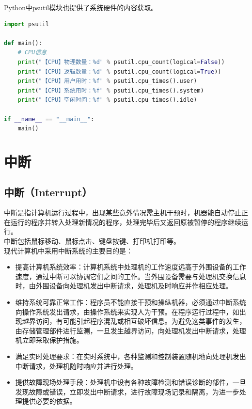 Python中psutil模块也提供了系统硬件的内容获取。 \\

\begin{lstlisting}[language=Python]
import psutil

def main():
	# CPU信息
	print("【CPU】物理数量：%d" % psutil.cpu_count(logical=False))
	print("【CPU】逻辑数量：%d" % psutil.cpu_count(logical=True))
	print("【CPU】用户用时：%f" % psutil.cpu_times().user)
	print("【CPU】系统用时：%f" % psutil.cpu_times().system)
	print("【CPU】空闲时间：%f" % psutil.cpu_times().idle)

if __name__ == "__main__":
	main()
\end{lstlisting}

\newpage

\section{中断}

\subsection{中断（Interrupt）}

中断是指计算机运行过程中，出现某些意外情况需主机干预时，机器能自动停止正在运行的程序并转入处理新情况的程序，处理完毕后又返回原被暂停的程序继续运行。 \\

中断包括鼠标移动、鼠标点击、键盘按键、打印机打印等。 \\

现代计算机中采用中断系统的主要目的是：

\begin{itemize}
	\item 提高计算机系统效率：计算机系统中处理机的工作速度远高于外围设备的工作速度，通过中断可以协调它们之间的工作。当外围设备需要与处理机交换信息时，由外围设备向处理机发出中断请求，处理机及时响应并作相应处理。

	\item 维持系统可靠正常工作：程序员不能直接干预和操纵机器，必须通过中断系统向操作系统发出请求，由操作系统来实现人为干预。在程序运行过程中，如出现越界访问，有可能引起程序混乱或相互破坏信息。为避免这类事件的发生，由存储管理部件进行监测，一旦发生越界访问，向处理机发出中断请求，处理机立即采取保护措施。

	\item 满足实时处理要求：在实时系统中，各种监测和控制装置随机地向处理机发出中断请求，处理机随时响应并进行处理。

	\item 提供故障现场处理手段：处理机中设有各种故障检测和错误诊断的部件，一旦发现故障或错误，立即发出中断请求，进行故障现场记录和隔离，为进一步处理提供必要的依据。
\end{itemize}

